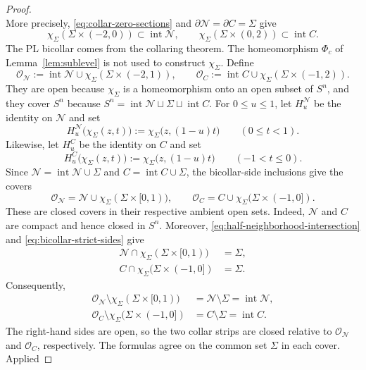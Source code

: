 \documentclass[12pt,oneside,a4paper]{article}
\theoremstyle{mytheorem}
\theoremstyle{remark}
\theoremstyle{definition}
\begin{document}
\begin{proof}
\[\]
More precisely, \eqref{eq:collar-zero-sections} and
$\partial\mathcal{N}=\partial C=\Sigma$ give
\begin{equation}\label{eq:bicollar-strict-sides}
 \chi_\Sigma(\Sigma\times(-2,0))
 \subset\operatorname{int}\mathcal{N},
 \qquad
 \chi_\Sigma(\Sigma\times(0,2))
 \subset\operatorname{int}C.
\end{equation}
The PL bicollar comes from the collaring theorem.  The homeomorphism
$\Phi_c$ of Lemma~\ref{lem:sublevel} is not used to construct
$\chi_\Sigma$.
Define
\[
 \mathcal{O}_{\mathcal{N}}
 :=\operatorname{int}\mathcal{N}\cup \chi_\Sigma(\Sigma\times(-2,1)),
 \qquad
\mathcal{O}_C
 :=\operatorname{int}C\cup \chi_\Sigma(\Sigma\times(-1,2)).
\]
They are open because $\chi_\Sigma$ is a homeomorphism onto an open
subset of $S^n$, and they cover $S^n$ because
$S^n=\operatorname{int}\mathcal{N}\sqcup\Sigma\sqcup\operatorname{int}C$.
For $0\leq u\leq1$, let $H^{\mathcal{N}}_u$ be the identity on
$\mathcal{N}$ and set
\[
 H^{\mathcal{N}}_u\bigl(\chi_\Sigma(z,t)\bigr)
 :=\chi_\Sigma\bigl(z,(1-u)t\bigr)
 \qquad(0\leq t<1).
\]
Likewise, let $H^C_u$ be the identity on $C$ and set
\[
 H^C_u\bigl(\chi_\Sigma(z,t)\bigr)
 :=\chi_\Sigma\bigl(z,(1-u)t\bigr)
 \qquad(-1<t\leq0).
\]
Since
$\mathcal{N}=\operatorname{int}\mathcal{N}\cup\Sigma$ and
$C=\operatorname{int}C\cup\Sigma$, the bicollar-side inclusions give
the covers
\[
 \mathcal{O}_{\mathcal{N}}
 =\mathcal{N}\cup\chi_\Sigma(\Sigma\times[0,1)),
 \qquad
 \mathcal{O}_C
 =C\cup\chi_\Sigma(\Sigma\times(-1,0]).
\]
These are closed covers in their respective ambient open sets.  Indeed,
$\mathcal{N}$ and $C$ are compact and hence closed in $S^n$.  Moreover,
\eqref{eq:half-neighborhood-intersection} and
\eqref{eq:bicollar-strict-sides} give
\[
\begin{aligned}
 \mathcal{N}\cap\chi_\Sigma(\Sigma\times[0,1))&=\Sigma,\\
 C\cap\chi_\Sigma(\Sigma\times(-1,0])&=\Sigma.
\end{aligned}
\]
Consequently,
\[
\begin{aligned}
 \mathcal{O}_{\mathcal{N}}
 \setminus\chi_\Sigma(\Sigma\times[0,1))
 &=\mathcal{N}\setminus\Sigma=\operatorname{int}\mathcal{N},\\
 \mathcal{O}_C
 \setminus\chi_\Sigma(\Sigma\times(-1,0])
 &=C\setminus\Sigma=\operatorname{int}C.
\end{aligned}
\]
The right-hand sides are open, so the two collar strips are closed
relative to $\mathcal{O}_{\mathcal{N}}$ and $\mathcal{O}_C$,
respectively.
The formulas agree on the common set $\Sigma$ in each cover.  Applied

\end{proof}
\end{document}
